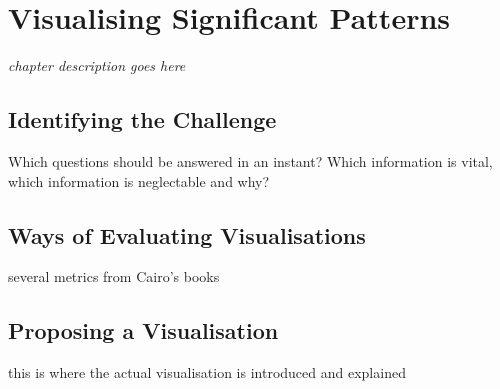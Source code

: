 
\chapter{Visualising Significant Patterns}
\emph{chapter description goes here}

\section{Identifying the Challenge}
Which questions should be answered in an instant? Which information is vital, which information is neglectable and why?

\section{Ways of Evaluating Visualisations}
several metrics from Cairo's books

\section{Proposing a Visualisation} %
this is where the actual visualisation is introduced and explained
